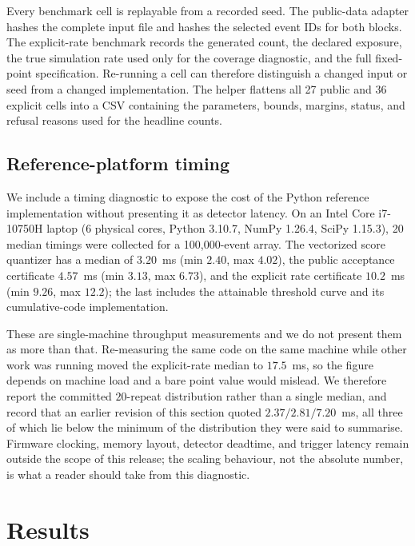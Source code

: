 \documentclass[preprint,12pt]{elsarticle}
\begin{document}
Every benchmark cell is replayable from a recorded seed.  The public-data
adapter hashes the complete input file and hashes the selected event IDs for
both blocks.  The explicit-rate benchmark records the generated count, the
declared exposure, the true simulation rate used only for the coverage
diagnostic, and the full fixed-point specification.  Re-running a cell can
therefore distinguish a changed input or seed from a changed implementation.
The helper  flattens all 27 public and 36 explicit
cells into a CSV containing the parameters, bounds, margins, status, and refusal
reasons used for the headline counts.

\subsection{Reference-platform timing}

We include a timing diagnostic to expose the cost of the Python reference
implementation without presenting it as detector latency.  On an Intel
Core i7-10750H laptop (6 physical cores, Python 3.10.7, NumPy 1.26.4, SciPy
1.15.3), 20 median timings were collected for a 100,000-event array.  The
vectorized score quantizer has a median of $3.20$~ms (min $2.40$, max $4.02$),
the public acceptance certificate $4.57$~ms (min $3.13$, max $6.73$), and the
explicit rate certificate $10.2$~ms (min $9.26$, max $12.2$); the last includes
the attainable threshold curve and its cumulative-code implementation.

These are single-machine throughput measurements and we do not present them as
more than that.  Re-measuring the same code on the same machine while other work
was running moved the explicit-rate median to $17.5$~ms, so the figure depends on
machine load and a bare point value would mislead.  We therefore report the
committed $20$-repeat distribution rather than a single median, and record that
an earlier revision of this section quoted $2.37/2.81/7.20$~ms, all three of
which lie below the minimum of the distribution they were said to summarise.
Firmware clocking, memory layout, detector deadtime, and trigger latency remain
outside the scope of this release; the scaling behaviour, not the absolute
number, is what a reader should take from this diagnostic.

\section{Results}
\label{sec:results}
\end{document}
